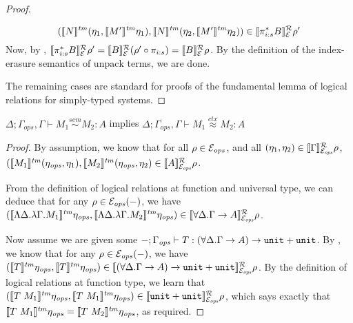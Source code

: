 \begin{proof}
\begin{description}
\begin{displaymath}
      (\llbracket N \rrbracket^{\mathit{tm}}(\eta_1,\llbracket M' \rrbracket^{\mathit{tm}}\eta_1),
       \llbracket N \rrbracket^{\mathit{tm}}(\eta_2,\llbracket M' \rrbracket^{\mathit{tm}}\eta_2)) \in \llbracket \pi_{i\mathord:s}^*B \rrbracket^{\mathcal{R}}_{\mathcal{E}}{\rho'}
    \end{displaymath}
    Now, by ,
    $\llbracket \pi_{i\mathord:s}^*B \rrbracket^{\mathcal{R}}_{\mathcal{E}}{\rho'} =
    \llbracket B \rrbracket^{\mathcal{R}}_{\mathcal{E}}{(\rho' \circ \pi_{i\mathord:s})} =
    \llbracket B \rrbracket^{\mathcal{R}}_{\mathcal{E}}{\rho}$. By the definition of the
    index-erasure semantics of $\mathrm{unpack}$ terms, we are done.
  \end{description}
  The remaining cases are standard for proofs of the fundamental lemma
  of logical relations for simply-typed systems.
\end{proof}

\begin{restateTheorem}
  $\Delta; \Gamma_{\mathit{ops}}, \Gamma \vdash M_1 \stackrel{sem}\sim M_2 : A$ implies
  $\Delta; \Gamma_{\mathit{ops}}, \Gamma \vdash M_1 \stackrel{ctx}\approx M_2 : A$
\end{restateTheorem}
\begin{proof}
  By assumption, we know that for all $\rho \in
  \mathcal{E}_{\mathit{ops}}$, and all $(\eta_1,\eta_2) \in
  \llbracket \Gamma \rrbracket^{\mathcal{R}}_{\mathcal{E}_{\mathit{ops}}}{\rho}$,
  $(\llbracket M_1 \rrbracket^{\mathit{tm}}(\eta_{\mathit{ops}},
  \eta_1),\llbracket M_2 \rrbracket^{\mathit{tm}}(\eta_{\mathit{ops}}, \eta_2) \in
  \llbracket A \rrbracket^{\mathcal{R}}_{\mathcal{E}_{\mathit{ops}}}{\rho}$.

  From the definition of logical relations at function and universal
  type, we can deduce that for any $\rho \in
  \mathcal{E}_{\mathit{ops}}(-)$, we have $(\llbracket \Lambda
    \Delta. \lambda \Gamma. M_1 \rrbracket^{\mathit{tm}}\eta_{\mathit{ops}},\llbracket \Lambda
    \Delta. \lambda \Gamma. M_2 \rrbracket^{\mathit{tm}}\eta_{\mathit{ops}}) \in \llbracket \forall
    \Delta.\Gamma \to A \rrbracket^{\mathcal{R}}_{\mathcal{E}_{\mathit{ops}}}{\rho}$.

  Now assume we are given some $-;\Gamma_{\mathit{ops}} \vdash T :
  (\forall \Delta. \Gamma \to A) \to \textup{\texttt{unit}} +
  \textup{\texttt{unit}}$. By , we know that for any
  $\rho \in \mathcal{E}_{\mathit{ops}}(-)$, we have
  $(\llbracket T \rrbracket^{\mathit{tm}}\eta_{\mathit{ops}}, \llbracket T \rrbracket^{\mathit{tm}}\eta_{\mathit{ops}}) \in
  \llbracket (\forall \Delta. \Gamma \to A) \to \textup{\texttt{unit}} +
    \textup{\texttt{unit}} \rrbracket^{\mathcal{R}}_{\mathcal{E}_{\mathit{ops}}}{\rho}$. By the
  definition of logical relations at function type, we learn that
  $(\llbracket T\ M_1 \rrbracket^{\mathit{tm}}\eta_{\mathit{ops}}, \llbracket T\
    M_1 \rrbracket^{\mathit{tm}}\eta_{\mathit{ops}}) \in \llbracket \textup{\texttt{unit}} +
    \textup{\texttt{unit}} \rrbracket^{\mathcal{R}}_{\mathcal{E}_{\mathit{ops}}}{\rho}$, which says
  exactly that $\tmSem{T\ M_1}\eta_{\mathit{ops}} = \tmSem{T\
    M_2}\eta_{\mathit{ops}}$, as required.
\end{proof}


